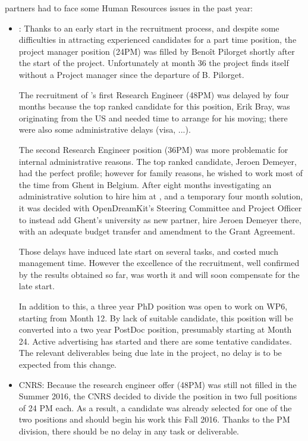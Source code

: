 \documentclass{deliverablereport}
\begin{document}
 \ODK partners had to face some Human Resources issues in the past year:
\begin{itemize}
\item{:}
  Thanks to an early start in the recruitment process, and despite
  some difficulties in attracting experienced candidates for a part
  time position, the project manager position (24PM) was filled by
  Benoît Pilorget shortly after the start of the project. Unfortunately at month 36 the project
finds itself without a Project manager since the departure of B. Pilorget.

  The recruitment of 's first Research Engineer (48PM) was
  delayed by four months because the top ranked candidate for this
  position, Erik Bray, was originating from the US and needed time to
  arrange for his moving; there were also some administrative delays
  (visa, ...).

  The second Research Engineer position (36PM) was more problematic
  for internal administrative reasons. The top ranked candidate,
  Jeroen Demeyer, had the perfect profile; however for family reasons,
  he wished to work most of the time from Ghent in Belgium. After eight
  months investigating an administrative solution to hire him at
  , and a temporary four month solution, it was decided with
  OpenDreamKit's Steering Committee and Project Officer to instead add
  Ghent's university as new partner, hire Jeroen Demeyer there, with an
  adequate budget transfer and amendment to the Grant Agreement.

  Those delays have induced late start on several tasks, and costed
  much management time. However the excellence of the recruitment, well
  confirmed by the results obtained so far, was worth it and will soon
  compensate for the late start.

  In addition to this, a three year PhD position was open to work on
  WP6, starting from Month 12. By lack of suitable candidate, this
  position will be converted into a two year PostDoc position,
  presumably starting at Month 24. Active advertising has started and
  there are some tentative candidates. The relevant deliverables being
  due late in
  the project, no delay is to be expected from this change.\\

\item{CNRS:} Because the research engineer offer (48PM) was still not
  filled in the Summer 2016, the CNRS decided to divide the position
  in two full positions of 24 PM each. As a result, a candidate was
  already selected for one of the two positions and should begin his
  work this Fall 2016.  Thanks to the PM division, there should be no
  delay in any task or
  deliverable. \\


\end{itemize}
\end{document}

